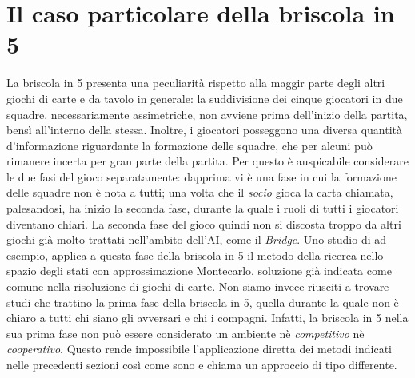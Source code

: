 \section{Il caso particolare della briscola in 5}

La briscola in 5 presenta una peculiarità rispetto alla maggir parte degli altri giochi di carte e da tavolo in generale: la suddivisione dei cinque giocatori in due squadre, necessariamente assimetriche, non avviene prima dell'inizio della partita, bensì all'interno della stessa.
Inoltre, i giocatori posseggono una diversa quantità d'informazione riguardante la formazione delle squadre, che per alcuni può rimanere incerta per gran parte della partita.
Per questo è auspicabile considerare le due fasi del gioco separatamente: dapprima vi è una fase in cui la formazione delle squadre non è nota a tutti; una volta che il \emph{socio} gioca la carta chiamata, palesandosi, ha inizio la seconda fase, durante la quale i ruoli di tutti i giocatori diventano chiari.
La seconda fase del gioco quindi non si discosta troppo da altri giochi già molto trattati nell'ambito dell'AI, come il \emph{Bridge}.
Uno studio di \cite{villa} ad esempio, applica a questa fase della briscola in 5 il metodo della ricerca nello spazio degli stati con approssimazione Montecarlo, soluzione già indicata come comune nella risoluzione di giochi di carte.
Non siamo invece riusciti a trovare studi che trattino la prima fase della briscola in 5, quella durante la quale non è chiaro a tutti chi siano gli avversari e chi i compagni.
Infatti, la briscola in 5 nella sua prima fase non può essere considerato un ambiente nè \emph{competitivo} nè \emph{cooperativo}.
Questo rende impossibile l'applicazione diretta dei metodi indicati nelle precedenti sezioni così come sono e chiama un approccio di tipo differente.

